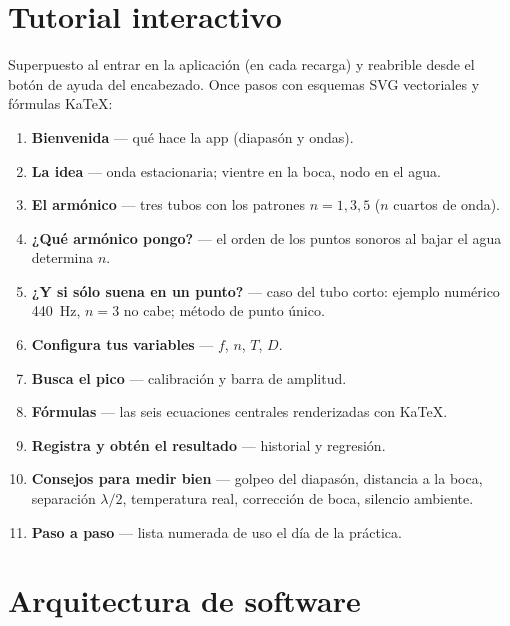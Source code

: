 \documentclass[11pt,a4paper]{article}
\begin{document}
\section{Tutorial interactivo}

Superpuesto al entrar en la aplicación (en cada recarga) y reabrible desde el botón de ayuda
del encabezado. Once pasos con esquemas SVG vectoriales y fórmulas KaTeX:

\begin{enumerate}[nosep]
  \item \textbf{Bienvenida} --- qué hace la app (diapasón y ondas).
  \item \textbf{La idea} --- onda estacionaria; vientre en la boca, nodo en el agua.
  \item \textbf{El armónico} --- tres tubos con los patrones $n = 1, 3, 5$ ($n$ cuartos de onda).
  \item \textbf{¿Qué armónico pongo?} --- el orden de los puntos sonoros al bajar el agua
        determina $n$.
  \item \textbf{¿Y si sólo suena en un punto?} --- caso del tubo corto: ejemplo numérico
        \SI{440}{\hertz}, $n{=}3$ no cabe; método de punto único.
  \item \textbf{Configura tus variables} --- $f$, $n$, $T$, $D$.
  \item \textbf{Busca el pico} --- calibración y barra de amplitud.
  \item \textbf{Fórmulas} --- las seis ecuaciones centrales renderizadas con KaTeX.
  \item \textbf{Registra y obtén el resultado} --- historial y regresión.
  \item \textbf{Consejos para medir bien} --- golpeo del diapasón, distancia a la boca,
        separación $\lambda/2$, temperatura real, corrección de boca, silencio ambiente.
  \item \textbf{Paso a paso} --- lista numerada de uso el día de la práctica.
\end{enumerate}

\section{Arquitectura de software}
\end{document}
